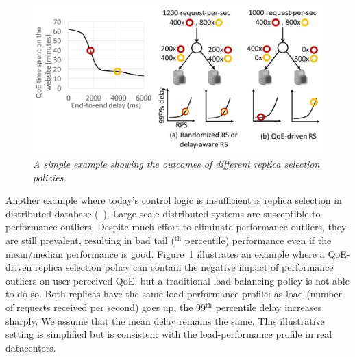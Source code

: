 
\begin{figure}
	\centering
	\includegraphics[width=1\textwidth]{figs/replica.pdf}
	\vspace{-0.9cm}
	\caption{\em A simple example showing the outcomes of different replica selection policies.}
	\label{fig:replica}
\end{figure}
Another example where today's control logic is insufficient is replica selection in distributed database (\eg~\cite{cassandra}).
Large-scale distributed systems are susceptible to performance outliers.
Despite much effort to eliminate performance outliers, they are still prevalent, resulting in bad tail ($^\textrm{th}$ percentile) performance even if the mean/median performance is good.
Figure~\ref{fig:replica} illustrates an example where a QoE-driven replica selection policy can contain the negative impact of performance outliers on user-perceived QoE, but a traditional load-balancing policy is not able to do so.
Both replicas have the same load-performance profile: as load (number of requests received per second) goes up, the 99$^\textrm{th}$ percentile delay increases sharply. We assume that the mean delay remains the same. 
This illustrative setting is simplified but is consistent with the load-performance profile in real datacenters. %
